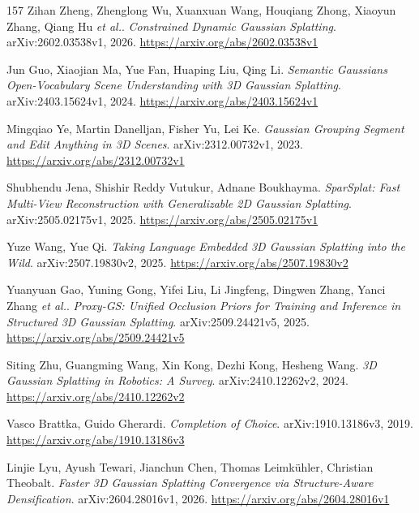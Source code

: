 \documentclass[11pt,a4paper]{article}
\begin{document}
\begin{thebibliography}{157}
Zihan Zheng, Zhenglong Wu, Xuanxuan Wang, Houqiang Zhong, Xiaoyun Zhang, Qiang Hu \emph{et al.}.
\newblock \emph{Constrained Dynamic Gaussian Splatting}.
\newblock arXiv:2602.03538v1, 2026.
\newblock \url{https://arxiv.org/abs/2602.03538v1}

Jun Guo, Xiaojian Ma, Yue Fan, Huaping Liu, Qing Li.
\newblock \emph{Semantic Gaussians Open-Vocabulary Scene Understanding with 3D Gaussian Splatting}.
\newblock arXiv:2403.15624v1, 2024.
\newblock \url{https://arxiv.org/abs/2403.15624v1}

Mingqiao Ye, Martin Danelljan, Fisher Yu, Lei Ke.
\newblock \emph{Gaussian Grouping Segment and Edit Anything in 3D Scenes}.
\newblock arXiv:2312.00732v1, 2023.
\newblock \url{https://arxiv.org/abs/2312.00732v1}

Shubhendu Jena, Shishir Reddy Vutukur, Adnane Boukhayma.
\newblock \emph{SparSplat: Fast Multi-View Reconstruction with Generalizable 2D Gaussian Splatting}.
\newblock arXiv:2505.02175v1, 2025.
\newblock \url{https://arxiv.org/abs/2505.02175v1}

Yuze Wang, Yue Qi.
\newblock \emph{Taking Language Embedded 3D Gaussian Splatting into the Wild}.
\newblock arXiv:2507.19830v2, 2025.
\newblock \url{https://arxiv.org/abs/2507.19830v2}

Yuanyuan Gao, Yuning Gong, Yifei Liu, Li Jingfeng, Dingwen Zhang, Yanci Zhang \emph{et al.}.
\newblock \emph{Proxy-GS: Unified Occlusion Priors for Training and Inference in Structured 3D Gaussian Splatting}.
\newblock arXiv:2509.24421v5, 2025.
\newblock \url{https://arxiv.org/abs/2509.24421v5}

Siting Zhu, Guangming Wang, Xin Kong, Dezhi Kong, Hesheng Wang.
\newblock \emph{3D Gaussian Splatting in Robotics: A Survey}.
\newblock arXiv:2410.12262v2, 2024.
\newblock \url{https://arxiv.org/abs/2410.12262v2}

Vasco Brattka, Guido Gherardi.
\newblock \emph{Completion of Choice}.
\newblock arXiv:1910.13186v3, 2019.
\newblock \url{https://arxiv.org/abs/1910.13186v3}

Linjie Lyu, Ayush Tewari, Jianchun Chen, Thomas Leimk\"{u}hler, Christian Theobalt.
\newblock \emph{Faster 3D Gaussian Splatting Convergence via Structure-Aware Densification}.
\newblock arXiv:2604.28016v1, 2026.
\newblock \url{https://arxiv.org/abs/2604.28016v1}


\end{thebibliography}
\end{document}
